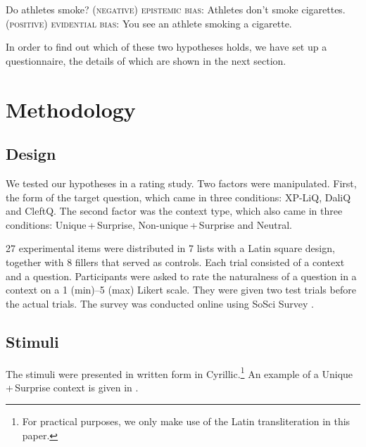 \documentclass[output=paper,
colorlinks,
citecolor=brown,
newtxmath
]{langscibook}
\begin{document}

\ea
\ea Do athletes smoke?
\ex \textsc{(negative) epistemic bias}: Athletes don't smoke cigarettes.
\ex \textsc{(positive) evidential bias}: You see an athlete smoking a cigarette.
\z \label{smoke} \z

\noindent
In order to find out which of these two hypotheses holds, we have set up a questionnaire, the details of which are shown in the next section.
\section{Methodology}\label{sec:method}

\subsection{Design}\largerpage
We tested our hypotheses in a rating study. Two factors were manipulated. First, the form of the target question, which came in three conditions: XP-LiQ, DaliQ and CleftQ. The second factor was the context type, which also came in three conditions: Unique\,+\,Surprise, Non-unique\,+\,Surprise and Neutral.

27 experimental items were distributed in 7 lists with a Latin square design, together with 8 fillers that served as controls. Each trial consisted of a context and a question.
Participants were asked to rate the naturalness of a question in a context on a 1 (min)--5 (max) Likert scale. They were given two test trials before the actual trials. The survey was conducted online using SoSci Survey \citep{leiner2014}.


 \subsection{Stimuli}
 The stimuli were presented in written form in  Cyrillic.\footnote{For practical purposes, we only make use of the Latin transliteration in this paper.} An example of a Unique\,+\,Surprise context is given in .

\end{document}

